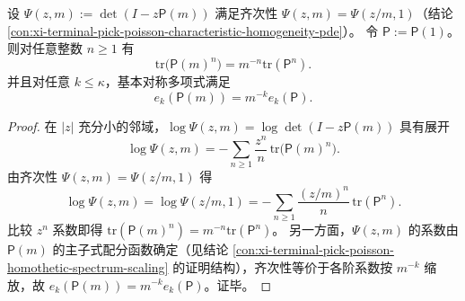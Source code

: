 \begin{auditthm}\label{thm:xi-schur-ledger-newton-sums-homogeneity}
设
\(
\Psi(z,m):=\det(I-z\mathsf P(m))
\)
满足齐次性 \(\Psi(z,m)=\Psi(z/m,1)\)（结论 \ref{con:xi-terminal-pick-poisson-characteristic-homogeneity-pde}）。
令 \(\mathsf P:=\mathsf P(1)\)。
则对任意整数 \(n\ge 1\) 有
\[
\mathrm{tr}\bigl(\mathsf P(m)^n\bigr)=m^{-n}\mathrm{tr}(\mathsf P^n).
\]
并且对任意 \(k\le \kappa\)，基本对称多项式满足
\[
e_k(\mathsf P(m))=m^{-k}e_k(\mathsf P).
\]
\end{auditthm}
\begin{proof}
在 \(|z|\) 充分小的邻域，\(\log\Psi(z,m)=\log\det(I-z\mathsf P(m))\) 具有展开
\[
\log\Psi(z,m)=-\sum_{n\ge 1}\frac{z^n}{n}\,\mathrm{tr}\bigl(\mathsf P(m)^n\bigr).
\]
由齐次性 \(\Psi(z,m)=\Psi(z/m,1)\) 得
\[
\log\Psi(z,m)=\log\Psi(z/m,1)=-\sum_{n\ge 1}\frac{(z/m)^n}{n}\,\mathrm{tr}(\mathsf P^n).
\]
比较 \(z^n\) 系数即得 \(\mathrm{tr}(\mathsf P(m)^n)=m^{-n}\mathrm{tr}(\mathsf P^n)\)。
另一方面，\(\Psi(z,m)\) 的系数由 \(\mathsf P(m)\) 的主子式配分函数确定（见结论 \ref{con:xi-terminal-pick-poisson-homothetic-spectrum-scaling} 的证明结构），齐次性等价于各阶系数按 \(m^{-k}\) 缩放，故 \(e_k(\mathsf P(m))=m^{-k}e_k(\mathsf P)\)。证毕。
\end{proof}

